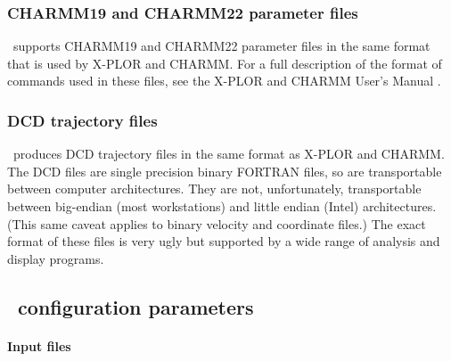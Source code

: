 \subsubsection{CHARMM19 and CHARMM22 parameter files}

\NAMD\ supports CHARMM19 and CHARMM22 parameter files in the same format 
that is used by X-PLOR and CHARMM.  
For a full description of the format of commands 
used in these files, see the X-PLOR and CHARMM User's Manual 
.  

\subsubsection{DCD trajectory files}

\NAMD\ produces DCD trajectory files in the same format as 
X-PLOR and CHARMM.  
The DCD files are single precision binary FORTRAN files, 
so are transportable between computer architectures.  
They are not, unfortunately, transportable between big-endian (most
workstations) and little endian (Intel) architectures.
(This same caveat applies to binary velocity and coordinate files.)
The exact format of these files is very ugly but supported by 
a wide range of analysis and display programs.  

\subsection{\NAMD\ configuration parameters}
\label{section:file_config}

\paragraph{Input files}

